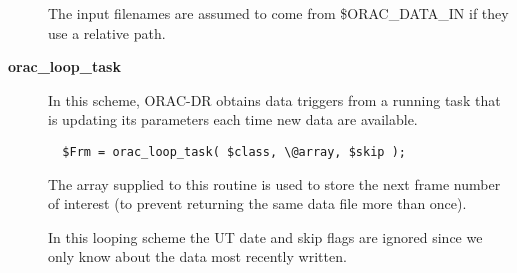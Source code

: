 \begin{description}
The input filenames are assumed to come from \$ORAC\_DATA\_IN if they use
a relative path.


\item[{\textbf{orac\_loop\_task}}] \mbox{}

In this scheme, ORAC-DR obtains data triggers from a running task
that is updating its parameters each time new data are available.

\begin{verbatim}
  $Frm = orac_loop_task( $class, \@array, $skip );
\end{verbatim}


The array supplied to this routine is used to store the next frame
number of interest (to prevent returning the same data file more than once).



In this looping scheme the UT date and skip flags are ignored since we
only know about the data most recently written.

\end{description}
